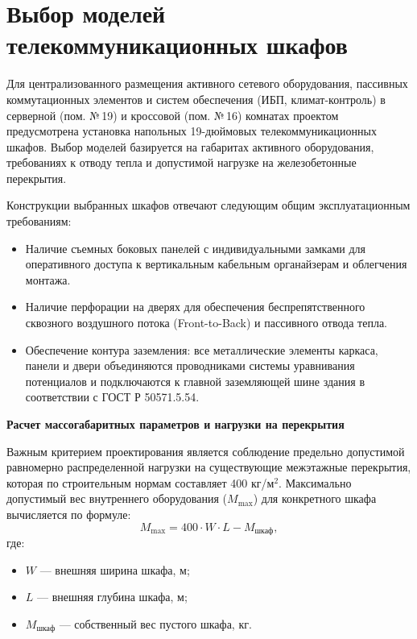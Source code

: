 \documentclass[a4paper,oneside,14pt]{extreport}
\begin{document}
\section{Выбор моделей телекоммуникационных шкафов}

Для централизованного размещения активного сетевого оборудования, пассивных коммутационных элементов и систем обеспечения (ИБП, климат-контроль) в серверной (пом. №\,19) и кроссовой (пом. №\,16) комнатах проектом предусмотрена установка напольных 19-дюймовых телекоммуникационных шкафов. Выбор моделей базируется на габаритах активного оборудования, требованиях к отводу тепла и допустимой нагрузке на железобетонные перекрытия.

Конструкции выбранных шкафов отвечают следующим общим эксплуатационным требованиям:
\begin{itemize}
    \item Наличие съемных боковых панелей с индивидуальными замками для оперативного доступа к вертикальным кабельным органайзерам и облегчения монтажа.
    \item Наличие перфорации на дверях для обеспечения беспрепятственного сквозного воздушного потока (Front-to-Back) и пассивного отвода тепла.
    \item Обеспечение контура заземления: все металлические элементы каркаса, панели и двери объединяются проводниками системы уравнивания потенциалов и подключаются к главной заземляющей шине здания в соответствии с ГОСТ Р 50571.5.54.
\end{itemize}

\textbf{Расчет массогабаритных параметров и нагрузки на перекрытия}

Важным критерием проектирования является соблюдение предельно допустимой равномерно распределенной нагрузки на существующие межэтажные перекрытия, которая по строительным нормам составляет 400 кг/м$^2$. 
Максимально допустимый вес внутреннего оборудования ($M_{\text{max}}$) для конкретного шкафа вычисляется по формуле:
\begin{equation}
    M_{\text{max}} = 400 \cdot W \cdot L - M_{\text{шкаф}},
\end{equation}
где:
\begin{itemize}
    \item $W$ --- внешняя ширина шкафа, м;
    \item $L$ --- внешняя глубина шкафа, м;
    \item $M_{\text{шкаф}}$ --- собственный вес пустого шкафа, кг.
\end{itemize}
\end{document}
